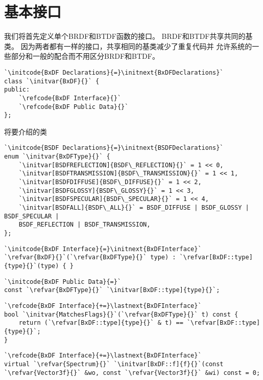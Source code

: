 \section{基本接口}\label{sec:基本接口}
我们将首先定义单个BRDF和BTDF函数的接口。
BRDF和BTDF共享共同的基类。
因为两者都有一样的接口，共享相同的基类减少了重复代码并
允许系统的一些部分和一般的配合而不用区分BRDF和BTDF。
\begin{lstlisting}
`\initcode{BxDF Declarations}{=}\initnext{BxDFDeclarations}`
class `\initvar{BxDF}{}` {
public:
    `\refcode{BxDF Interface}{}`
    `\refcode{BxDF Public Data}{}`
};
\end{lstlisting}
将要介绍的类

\begin{lstlisting}
`\initcode{BSDF Declarations}{=}\initnext{BSDFDeclarations}`
enum `\initvar{BxDFType}{}` {
    `\initvar[BSDFREFLECTION]{BSDF\_REFLECTION}{}` = 1 << 0,
    `\initvar[BSDFTRANSMISSION]{BSDF\_TRANSMISSION}{}` = 1 << 1,
    `\initvar[BSDFDIFFUSE]{BSDF\_DIFFUSE}{}` = 1 << 2,
    `\initvar[BSDFGLOSSY]{BSDF\_GLOSSY}{}` = 1 << 3,
    `\initvar[BSDFSPECULAR]{BSDF\_SPECULAR}{}` = 1 << 4,
    `\initvar[BSDFALL]{BSDF\_ALL}{}` = BSDF_DIFFUSE | BSDF_GLOSSY | BSDF_SPECULAR |
    BSDF_REFLECTION | BSDF_TRANSMISSION,
};
\end{lstlisting}

\begin{lstlisting}
`\initcode{BxDF Interface}{=}\initnext{BxDFInterface}`
`\refvar{BxDF}{}`(`\refvar{BxDFType}{}` type) : `\refvar[BxDF::type]{type}{}`(type) { }
\end{lstlisting}

\begin{lstlisting}
`\initcode{BxDF Public Data}{=}`
const `\refvar{BxDFType}{}` `\initvar[BxDF::type]{type}{}`;
\end{lstlisting}

\begin{lstlisting}
`\refcode{BxDF Interface}{+=}\lastnext{BxDFInterface}`
bool `\initvar{MatchesFlags}{}`(`\refvar{BxDFType}{}` t) const {
    return (`\refvar[BxDF::type]{type}{}` & t) == `\refvar[BxDF::type]{type}{}`;
}
\end{lstlisting}

\begin{lstlisting}
`\refcode{BxDF Interface}{+=}\lastnext{BxDFInterface}`
virtual `\refvar{Spectrum}{}` `\initvar[BxDF::f]{f}{}`(const `\refvar{Vector3f}{}` &wo, const `\refvar{Vector3f}{}` &wi) const = 0;
\end{lstlisting}